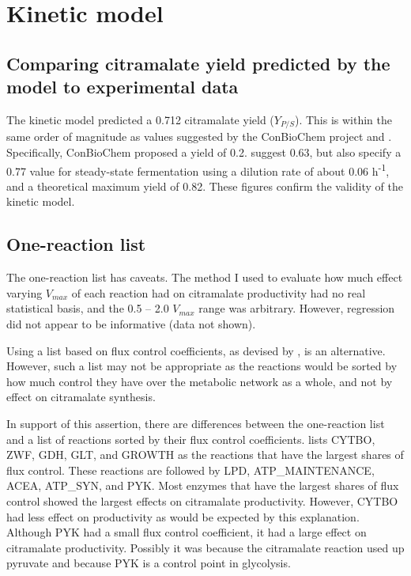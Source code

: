 \documentclass[parskip=full, numbers=noenddot]{scrreprt}
\begin{document}
\section{Kinetic model}
\label{sec:discussion-kinetic}


\subsection{Comparing citramalate yield predicted by the model to experimental data}
\label{ssec:discussion-kinetic-experimental}

The kinetic model predicted a 0.712 citramalate yield ($Y_{P/S}$). This is within the same order of magnitude as values suggested by the ConBioChem project and \citet{wu_production_2016}. Specifically, ConBioChem proposed a yield of 0.2. \citet{wu_production_2016} suggest 0.63, but also specify a 0.77 value for steady-state fermentation using a dilution rate of about 0.06 h\textsuperscript{-1}, and a theoretical maximum yield of 0.82. These figures confirm the validity of the kinetic model.

\subsection{One-reaction list}
\label{ssec:discussion-kinetic-onereaction}

The one-reaction list has caveats. The method I used to evaluate how much effect varying $V_{max}$ of each reaction had on citramalate productivity had no real statistical basis, and the 0.5 -- 2.0 $V_{max}$ range was arbitrary. However, regression did not appear to be informative (data not shown).

Using a list based on flux control coefficients, as devised by \citet{millard_metabolic_2017}, is an alternative. However, such a list may not be appropriate as the reactions would be sorted by how much control they have over the metabolic network as a whole, and not by effect on citramalate synthesis.

In support of this assertion, there are differences between the one-reaction list and a list of reactions sorted by their flux control coefficients.
\citet{millard_metabolic_2017} lists CYTBO, ZWF, GDH, GLT, and GROWTH as the reactions that have the largest shares of flux control. These reactions are followed by LPD, ATP\_MAINTENANCE, ACEA, ATP\_SYN, and PYK. Most enzymes that have the largest shares of flux control showed the largest effects on citramalate productivity. However, CYTBO had less effect on productivity as would be expected by this explanation. Although PYK had a small flux control coefficient, it had a large effect on citramalate productivity. Possibly it was because the citramalate reaction used up pyruvate and because PYK is a control point in glycolysis.
\end{document}
